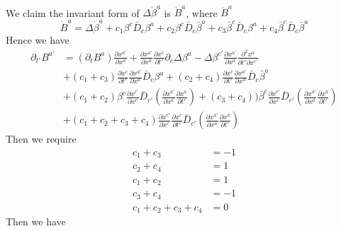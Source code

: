 \documentclass{article}
\begin{document}
\\
We claim the invariant form of $\Delta {\dot \beta}^{a}$ is ${\dot B}^{a}$, where ${\dot B}^{a}$
\[
{\dot B}^{a} = \Delta {\dot \beta}^{a} + c_{1}\beta^{c}{\bar D}_{c}\beta^{a} + c_{2}\beta^{c}{\bar D}_{c}{\bar \beta}^{a} + c_{3}{\bar \beta}^{c}{\bar D}_{c}\beta^{a} + c_{4}{\bar \beta}^{c}{\bar D}_{c}{\bar \beta}^{a}
\]
Hence we have
\begin{align*}
\partial_{t'}B^{a'} & = (\partial_{t}B^{a})\frac{\partial x^{a'}}{\partial x^{a}} + \frac{\partial x^{a'}}{\partial x^{a}}\frac{\partial x^{c}}{\partial t'}\partial_{c}\Delta \beta^{a} - \Delta \beta^{c'}\frac{\partial x^{a'}}{\partial x^{a}}\frac{\partial^2 x^{a}}{\partial t' \partial x^{c'}}\\
& + (c_{1}+c_{3})\frac{\partial x^{c}}{\partial t'}\frac{\partial x^{a'}}{\partial x^{a}}{\bar D}_{c}\beta^{a} + (c_{2} + c_{4})\frac{\partial x^{c}}{\partial t'}\frac{\partial x^{a'}}{\partial x^{a}}{\bar D}_{c}{\bar \beta}^{a}\\
& + (c_{1} + c_{2})\beta^{c}\frac{\partial x^{c'}}{\partial x^{c}}{\bar D}_{c'}(\frac{\partial x^{a'}}{\partial x^{a}}\frac{\partial x^{a}}{\partial t'}) + (c_{3} + c_{4})){\bar \beta}^{c}\frac{\partial x^{c'}}{\partial x^{c}}{\bar D}_{c'}(\frac{\partial x^{a'}}{\partial x^{a}}\frac{\partial x^{a}}{\partial t'})\\
& + (c_{1} + c_{2} + c_{3} + c_{4}) \frac{\partial x^{c'}}{\partial x^{c}}\frac{\partial x^{c}}{\partial t'} {\bar D}_{c'}(\frac{\partial x^{a'}}{\partial x^{a}}\frac{\partial x^{a}}{\partial t'})
\end{align*}
Then we require
\begin{align*}
c_{1} + c_{3} &= -1\\
c_{2} + c_{4} & = 1\\
c_{1} + c_{2} & = 1\\
c_{3} + c_{4} & = -1\\
c_{1} + c_{2} + c_{3} + c_{4} &= 0
\end{align*}
Then we have
\end{document}
